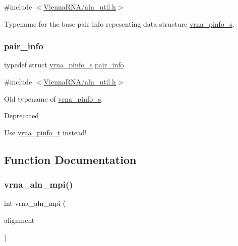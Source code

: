 {\ttfamily \#include $<$\mbox{\hyperlink{aln__util_8h}{Vienna\+R\+N\+A/aln\+\_\+util.\+h}}$>$}



Typename for the base pair info repesenting data structure \mbox{\hyperlink{group__aln__utils_structvrna__pinfo__s}{vrna\+\_\+pinfo\+\_\+s}}. 

\mbox{\label{group__aln__utils_ga7b61662a793ad0aa1ea38efc3a5baacc}} 
\subsubsection{\texorpdfstring{pair\+\_\+info}{pair\_info}}
{\footnotesize\ttfamily typedef struct \mbox{\hyperlink{group__aln__utils_structvrna__pinfo__s}{vrna\+\_\+pinfo\+\_\+s}} \mbox{\hyperlink{group__aln__utils_ga7b61662a793ad0aa1ea38efc3a5baacc}{pair\+\_\+info}}}



{\ttfamily \#include $<$\mbox{\hyperlink{aln__util_8h}{Vienna\+R\+N\+A/aln\+\_\+util.\+h}}$>$}



Old typename of \mbox{\hyperlink{group__aln__utils_structvrna__pinfo__s}{vrna\+\_\+pinfo\+\_\+s}}. 

\begin{DoxyRefDesc}{Deprecated}
\item[\mbox{\hyperlink{deprecated__deprecated000026}{Deprecated}}]Use \mbox{\hyperlink{group__aln__utils_ga6660dfca23debee7306e0cd53341263f}{vrna\+\_\+pinfo\+\_\+t}} instead! \end{DoxyRefDesc}


\subsection{Function Documentation}
\mbox{\label{group__aln__utils_gade5a1f2d16e7fd9a57b37d8514f08e8e}} 
\subsubsection{\texorpdfstring{vrna\+\_\+aln\+\_\+mpi()}{vrna\_aln\_mpi()}}
{\footnotesize\ttfamily int vrna\+\_\+aln\+\_\+mpi (\begin{DoxyParamCaption}\item[{const char $\ast$$\ast$}]{alignment }\end{DoxyParamCaption})}



